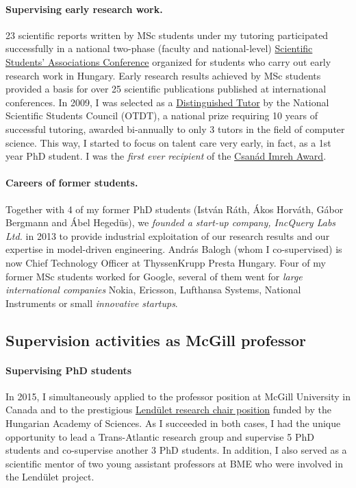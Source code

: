 \paragraph{Supervising early research work.} 
23 scientific reports written by MSc students under my tutoring participated successfully in a national two-phase (faculty and national-level) \href{http://www.otdt.hu/hu/cms/otdk/orszagos-tudomanyos-diakkori-konferencia/}{Scientific Students’ Associations Conference} organized for students who carry out early research work in Hungary. Early research results achieved by MSc students provided a basis for over 25 scientific publications published at international conferences. In 2009, I was selected as a \href{http://www.otdt.hu/page/kituntetesek/mak2009.php}{Distinguished Tutor} by the National Scientific Students Council (OTDT), a national prize requiring 10 years of successful tutoring, awarded bi-annually to only 3 tutors in the field of computer science. This way, I started to focus on talent care very early, in fact, as a 1st year PhD student. I was the \emph{first ever recipient} of the \href{https://otdk2017.mik.uni-pannon.hu/index.php/eredmenyek}{Csanád Imreh Award}.

\paragraph{Careers of former students.} Together with 4 of my former PhD students (István Ráth, Ákos Horváth, Gábor Bergmann and Ábel Hegedüs), we \emph{founded a start-up company, IncQuery Labs Ltd.} in 2013 to provide industrial exploitation of our research results and our expertise in model-driven engineering. András Balogh (whom I co-supervised) is now Chief Technology Officer at ThyssenKrupp Presta Hungary. Four of my former MSc students worked for Google, several of them went for \emph{large international companies} Nokia, Ericsson, Lufthansa Systems, National Instruments or small \emph{innovative startups}.


\subsection{Supervision activities as McGill professor}

\paragraph{Supervising PhD students}
In 2015, I simultaneously applied to the professor position at McGill University in Canada and to the prestigious 
\href{https://mta.hu/lendulet}{Lendület research chair position} funded by the Hungarian Academy of Sciences. 
As I succeeded in both cases, I had the unique opportunity to lead a Trans-Atlantic research group and supervise 5 PhD 
students and co-supervise another 3 PhD students.  In addition, I also served as a scientific mentor of two young assistant 
professors at BME who were involved in the Lendület project.

